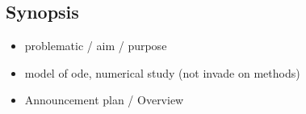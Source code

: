 \documentclass{article}
\begin{document}




\subsection*{Synopsis}

\begin{itemize}
    \item problematic / aim / purpose
    \item model of ode, numerical study (not invade on methods)
    \item Announcement plan / Overview
\end{itemize}


\newpage
\end{document}
